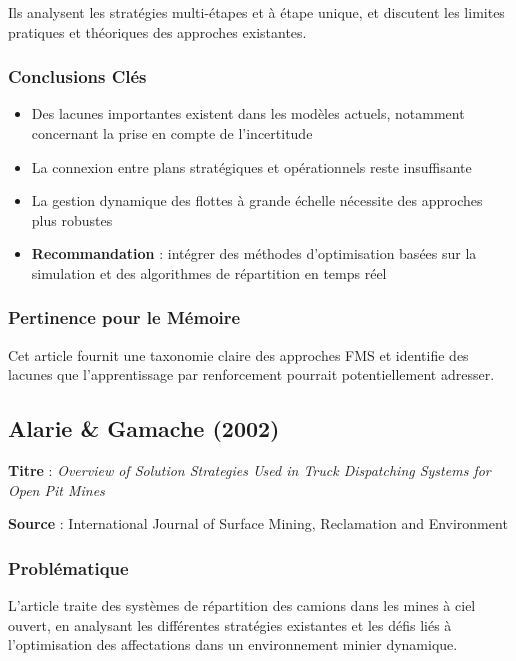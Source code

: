 \documentclass[12pt,a4paper]{article}
\begin{document}
Ils analysent les stratégies multi-étapes et à étape unique, et discutent les limites pratiques et théoriques des approches existantes.

\subsubsection{Conclusions Clés}

\begin{itemize}
    \item Des lacunes importantes existent dans les modèles actuels, notamment concernant la prise en compte de l'incertitude
    \item La connexion entre plans stratégiques et opérationnels reste insuffisante
    \item La gestion dynamique des flottes à grande échelle nécessite des approches plus robustes
    \item \textbf{Recommandation} : intégrer des méthodes d'optimisation basées sur la simulation et des algorithmes de répartition en temps réel
\end{itemize}

\subsubsection{Pertinence pour le Mémoire}

Cet article fournit une taxonomie claire des approches FMS et identifie des lacunes que l'apprentissage par renforcement pourrait potentiellement adresser.

\subsection{Alarie \& Gamache (2002)}

\textbf{Titre} : \textit{Overview of Solution Strategies Used in Truck Dispatching Systems for Open Pit Mines}

\textbf{Source} : International Journal of Surface Mining, Reclamation and Environment

\subsubsection{Problématique}

L'article traite des systèmes de répartition des camions dans les mines à ciel ouvert, en analysant les différentes stratégies existantes et les défis liés à l'optimisation des affectations dans un environnement minier dynamique.
\end{document}

